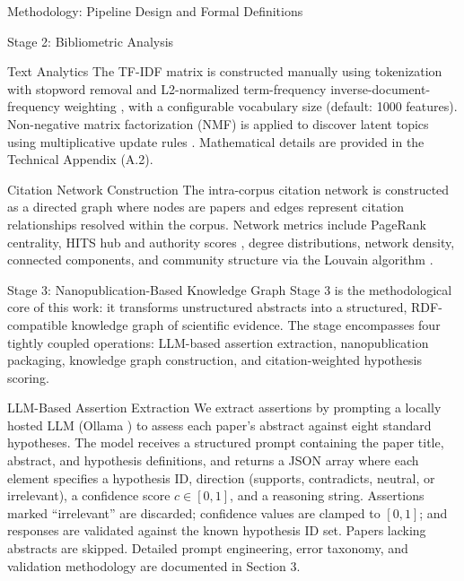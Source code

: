 \documentclass[
  ignorenonframetext,
]{beamer}
\begin{document}
\begin{frame}[fragile]{Methodology: Pipeline Design and Formal
Definitions}
\begin{block}{Stage 2: Bibliometric Analysis}
\begin{block}{Text Analytics}
\protect{}\label{text-analytics}
The TF-IDF matrix is constructed manually using tokenization with
stopword removal and L2-normalized term-frequency
inverse-document-frequency weighting \citep{salton1975vector}, with a
configurable vocabulary size (default: 1000 features). Non-negative
matrix factorization (NMF) is applied to discover latent topics using
multiplicative update rules \citep{lee1999nmf}. Mathematical details are
provided in the Technical Appendix (A.2).
\end{block}

\begin{block}{Citation Network Construction}
\protect{}\label{citation-network-construction}
The intra-corpus citation network is constructed as a directed graph
where nodes are papers and edges represent citation relationships
resolved within the corpus. Network metrics include PageRank centrality,
HITS hub and authority scores \citep{kleinberg1999authoritative}, degree
distributions, network density, connected components, and community
structure via the Louvain algorithm \citep{blondel2008louvain}.
\end{block}
\end{block}

\begin{block}{Stage 3: Nanopublication-Based Knowledge Graph}
\protect{}\label{stage-3-nanopublication-based-knowledge-graph}
Stage 3 is the methodological core of this work: it transforms
unstructured abstracts into a structured, RDF-compatible knowledge graph
of scientific evidence. The stage encompasses four tightly coupled
operations: LLM-based assertion extraction, nanopublication packaging,
knowledge graph construction, and citation-weighted hypothesis scoring.

\begin{block}{LLM-Based Assertion Extraction}
\protect{}\label{llm-based-assertion-extraction}
We extract assertions by prompting a locally hosted LLM (Ollama
\citep{ollama2024}) to assess each paper's abstract against eight
standard hypotheses. The model receives a structured prompt containing
the paper title, abstract, and hypothesis definitions, and returns a
JSON array where each element specifies a hypothesis ID, direction
(supports, contradicts, neutral, or irrelevant), a confidence score
\(c \in [0, 1]\), and a reasoning string. Assertions marked
``irrelevant'' are discarded; confidence values are clamped to
\([0, 1]\); and responses are validated against the known hypothesis ID
set. Papers lacking abstracts are skipped. Detailed prompt engineering,
error taxonomy, and validation methodology are documented in Section 3.
\end{block}


\end{block}
\end{frame}
\end{document}
